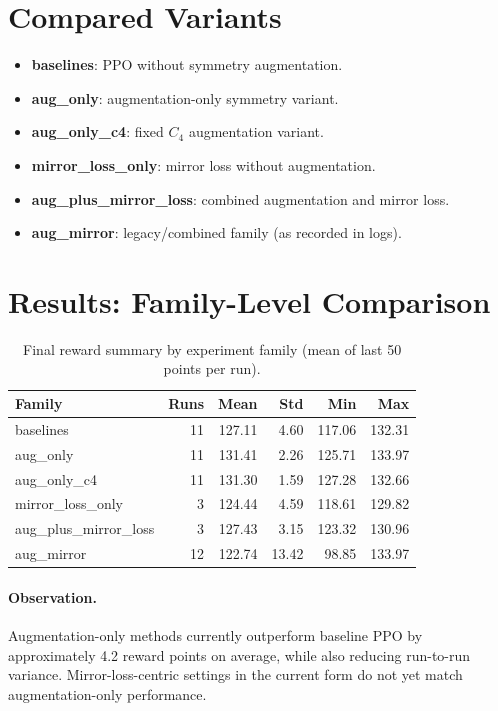 \documentclass[11pt]{article}
\begin{document}
\section{Compared Variants}
\begin{itemize}
    \item \textbf{baselines}: PPO without symmetry augmentation.
    \item \textbf{aug\_only}: augmentation-only symmetry variant.
    \item \textbf{aug\_only\_c4}: fixed $C_4$ augmentation variant.
    \item \textbf{mirror\_loss\_only}: mirror loss without augmentation.
    \item \textbf{aug\_plus\_mirror\_loss}: combined augmentation and mirror loss.
    \item \textbf{aug\_mirror}: legacy/combined family (as recorded in logs).
\end{itemize}

\section{Results: Family-Level Comparison}
\begin{table}[H]
\centering
\caption{Final reward summary by experiment family (mean of last 50 points per run).}
\begin{tabular}{lrrrrr}
\toprule
Family & Runs & Mean & Std & Min & Max \\
\midrule
baselines & 11 & 127.11 & 4.60 & 117.06 & 132.31 \\
aug\_only & 11 & 131.41 & 2.26 & 125.71 & 133.97 \\
aug\_only\_c4 & 11 & 131.30 & 1.59 & 127.28 & 132.66 \\
mirror\_loss\_only & 3 & 124.44 & 4.59 & 118.61 & 129.82 \\
aug\_plus\_mirror\_loss & 3 & 127.43 & 3.15 & 123.32 & 130.96 \\
aug\_mirror & 12 & 122.74 & 13.42 & 98.85 & 133.97 \\
\bottomrule
\end{tabular}
\end{table}

\paragraph{Observation.}
Augmentation-only methods currently outperform baseline PPO by approximately 4.2 reward points on average, while also reducing run-to-run variance. Mirror-loss-centric settings in the current form do not yet match augmentation-only performance.
\end{document}
